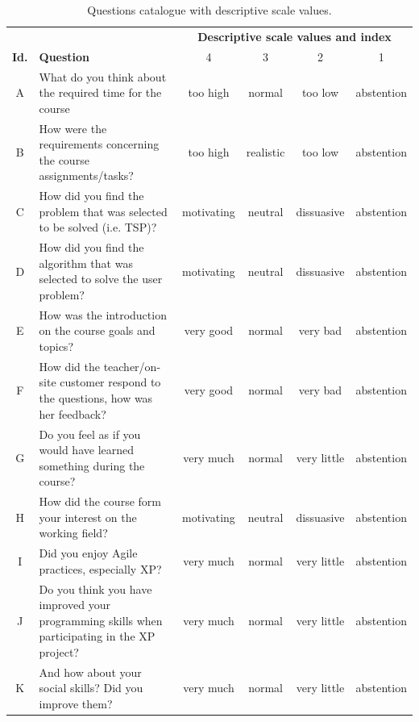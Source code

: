 \documentclass[conference]{IEEEtran}
\begin{document}
\begin{table}[!t]
  \renewcommand{\arraystretch}{1.3}
  \setlength{\tabcolsep}{0.6em}
  \caption{Questions catalogue with descriptive scale values.}
  \label{tab:questions}
  \centering
  \begin{threeparttable}
  \begin{tabular}{|c|l||cccc|}
    \hline
    & & \multicolumn{4}{|c|}{\bfseries Descriptive scale values and index}\\
    \cline{3-6}
    \multicolumn{1}{|c|}{\bfseries Id.} & \multicolumn{1}{|l||}{\bfseries Question} & \multicolumn{1}{|c}{4} & \multicolumn{1}{c}{3} & \multicolumn{1}{c}{2} & \multicolumn{1}{c|}{1\tnote{a}}\\
    \hline\hline
    A & What do you think about the required time for the course & too high & normal & too low & abstention\\
    B & How were the requirements concerning the course assignments/tasks? & too high & realistic & too low & abstention\\
    C & How did you find the problem that was selected to be solved (i.e. TSP)? & motivating & neutral & dissuasive & abstention\\
    D & How did you find the algorithm that was selected to solve the user problem? & motivating & neutral & dissuasive & abstention\\
    \hline
    E & How was the introduction on the course goals and topics? & very good & normal & very bad & abstention\\
    F & How did the teacher/on-site customer respond to the questions, how was her feedback? & very good & normal & very bad & abstention\\
    \hline
    G & Do you feel as if you would have learned something during the course? & very much & normal & very little & abstention\\
    H & How did the course form your interest on the working field? & motivating & neutral & dissuasive & abstention\\
    \hline
    I & Did you enjoy Agile practices, especially XP? & very much & normal & very little & abstention\\
    J & Do you think you have improved your programming skills when participating in the XP project? & very much & normal & very little & abstention\\
    K & And how about your social skills? Did you improve them? & very much & normal & very little & abstention\\

\end{tabular}
\end{threeparttable}
\end{table}
\end{document}
